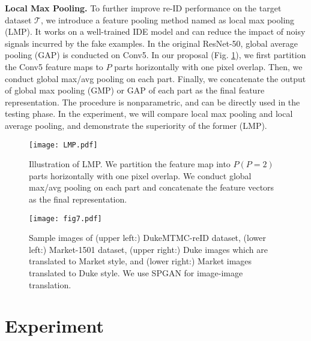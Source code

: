 \documentclass[10pt,twocolumn,letterpaper]{article}
\begin{document}
\textbf{Local Max Pooling.} To further improve re-ID performance on the target dataset $\mathcal{T}$, we introduce a feature pooling method named as local max pooling (LMP). It works on a well-trained IDE model and can reduce the impact of noisy signals incurred by the fake examples. 
In the original ResNet-50, global average pooling (GAP) is conducted on Conv5. In our proposal (Fig. \ref{fig:LMP}), 
we first partition the Conv5 feature maps to $P$ parts horizontally with one pixel overlap. Then, we conduct global max/avg pooling on each part. Finally, we concatenate the output of global max pooling (GMP) or GAP of each part as the final feature representation. The procedure is nonparametric, and can be directly used in the testing phase. In the experiment, we will compare local max pooling and local average pooling, and demonstrate the superiority of the former (LMP).
\begin{figure}[t]
\setlength{\abovecaptionskip}{-0.1cm} 
\setlength{\belowcaptionskip}{-0.2cm}
\begin{center}
\texttt{[image: LMP.pdf]}
\end{center}
\caption{Illustration of LMP. We partition the feature map into $P (P=2)$ parts horizontally with one pixel overlap. We conduct global max/avg pooling on each part and concatenate the feature vectors as the final representation.}
\label{fig:LMP}
\end{figure}
\begin{figure}[t]
\setlength{\abovecaptionskip}{-0.1cm} 
\setlength{\belowcaptionskip}{-0.1cm}
\begin{center}
\texttt{[image: fig7.pdf]}
\end{center}
\caption{Sample images of (upper left:) DukeMTMC-reID dataset, (lower left:) Market-1501 dataset, (upper right:) Duke images which are translated to Market style, and (lower right:) Market images translated to Duke style. We use SPGAN for image-image translation.}
\label{fig:sample_images}
\end{figure}


\section{Experiment} \label{experiments}
\end{document}
